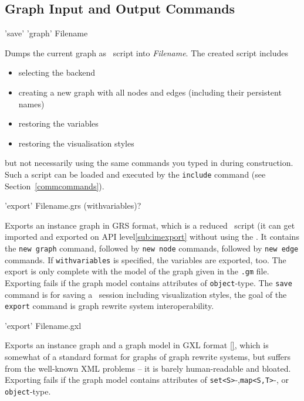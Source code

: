 \subsection{Graph Input and Output Commands}
\label{outputcmds}

\begin{rail}
  'save' 'graph' Filename
\end{rail}
Dumps the current graph as \GrShell\ script into \emph{Filename}.
The created script includes
\begin{itemize}
  \item selecting the backend
  \item creating a new graph with all nodes and edges (including their persistent names)
  \item restoring the variables
  \item restoring the visualisation styles
\end{itemize}
but not necessarily using the same commands you typed in during construction. 
Such a script can be loaded and executed by the \texttt{include} command (see Section~\ref{commcommands}).

\begin{rail}
  'export' Filename.grs (withvariables)?
\end{rail}
Exports an instance graph in GRS format, which is a reduced \GrShell\ script (it can get imported and exported on API level\ref{sub:imexport} without using the \GrShell\).
It contains the \texttt{new graph} command, followed by \texttt{new node} commands, followed by \texttt{new edge} commands.
If \texttt{withvariables} is specified, the variables are exported, too.
The export is only complete with the model of the graph given in the \texttt{.gm} file.
Exporting fails if the graph model contains attributes of \texttt{object}-type.
The \texttt{save} command is for saving a \GrShell\ session including visualization styles, the goal of the \texttt{export} command is graph rewrite system interoperability.

\begin{rail}
  'export' Filename.gxl
\end{rail}
Exports an instance graph and a graph model in GXL format \ref{}, which is somewhat of a standard format for graphs of graph rewrite systems, but suffers from the well-known XML problems -- it is barely human-readable and bloated.
Exporting fails if the graph model contains attributes of \texttt{set<S>}-,\texttt{map<S,T>}-, or \texttt{object}-type.

